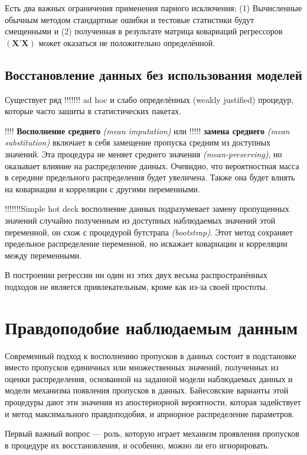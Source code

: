 Есть два важных ограничения применения парного исключения: (1) Вычисленные обычным методом стандартные ошибки и тестовые статистики будут смещенными и (2) полученная в результате матрица ковариаций регрессоров $(\mathbf{X’X})$ может оказаться не положительно определённой.

\subsection{Восстановление данных без использования моделей} 

Существует ряд !!!!!!! ad hoc и слабо определённых (weakly justified) процедур, которые часто зашиты в статистических пакетах.

!!!! {\bf Восполнение среднего} \emph{(mean imputation)} или !!!!! {\bf замена среднего} \emph{(mean substitution)} включает в себя замещение пропуска средним из доступных значений. Эта процедура не меняет среднего значения \emph{(mean-preserving)}, но оказывает влияние на распределение данных. Очевидно, что вероятностная масса в середине предельного распределения будет увеличена. Также она будет влиять на ковариации и корреляции с другими переменными.

!!!!!!!Simple hot deck восполнение данных подразумевает замену пропущенных значений случайно полученным из доступных наблюдаемых значений этой переменной, он схож с процедурой бутстрапа \emph{(bootstrap)}. Этот метод сохраняет предельное распределение переменной, но искажает ковариации и корреляции между переменными. 

В построении регрессии ни один из этих двух весьма распространённых подходов не является привлекательным, кроме как из-за своей простоты.

\section{Правдоподобие наблюдаемым данным} 

Современный подход к восполнению пропусков в данных состоит в подстановке вместо пропусков единичных или множественных значений, полученных из оценки распределения, основанной на заданной модели наблюдаемых данных и модели механизма появления пропусков в данных. Байесовские варианты этой процедуры дают эти значения из апостериорной вероятности, которая задействует и метод максимального правдоподобия, и априорное распределение параметров.

Первый важный вопрос --– роль, которую играет механизм проявления пропусков в процедуре их восстановления, и особенно, можно ли его игнорировать.


